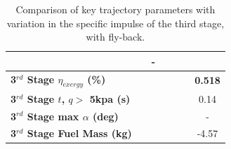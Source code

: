 \begin{table}[ht]
\begin{tabular}{l c c c c c c}
		& \returnFuelISPThreeOneHundredTen
		& -
		\\
		\hline 
		\textbf{3$^{rd}$ Stage $\eta_{exergy}$ (\%)}
		& \textbf{\thirddExergyEffISPThreeNinety}
		& \textbf{\thirddExergyEffISPThreeNinetyFive}
		& \textbf{\thirddExergyEffISPThreeStandard}
		& \textbf{\thirddExergyEffISPThreeOneHundredFive}
		& \textbf{\thirddExergyEffISPThreeOneHundredTen}
		& \textbf{0.518}
		\\
		\textbf{3$^{rd}$ Stage $t$, $q >$ 5kpa (s)}
		& \thirdqOverFiveISPThreeNinety
		& \thirdqOverFiveISPThreeNinetyFive
		& \thirdqOverFiveISPThreeStandard
		& \thirdqOverFiveISPThreeOneHundredFive
		& \thirdqOverFiveISPThreeOneHundredTen
		&0.14
		\\
		\textbf{3$^{rd}$ Stage max $\alpha$ (deg)}
		& \thirdmaxAoAISPThreeNinety
		& \thirdmaxAoAISPThreeNinetyFive
		& \thirdmaxAoAISPThreeStandard
		& \thirdmaxAoAISPThreeOneHundredFive
		& \thirdmaxAoAISPThreeOneHundredTen
		& -
		\\
		\textbf{3$^{rd}$ Stage Fuel Mass (kg)}
		& \thirdmFuelISPThreeNinety
		& \thirdmFuelISPThreeNinetyFive
		& \thirdmFuelISPThreeStandard
		& \thirdmFuelISPThreeOneHundredFive
		& \thirdmFuelISPThreeOneHundredTen
		&-4.57
		\\
		\hline 
	\end{tabular} 
	\caption{Comparison of key trajectory parameters with variation in the specific impulse of the third stage, with fly-back.}
	\label{tab:isp3}
\end{table}

